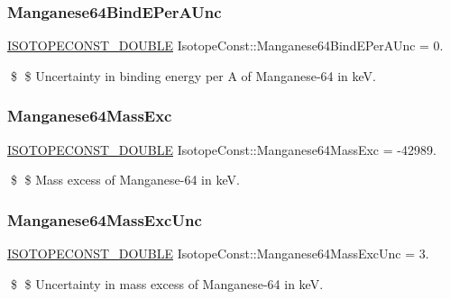 \subsubsection{\texorpdfstring{Manganese64\+Bind\+E\+Per\+A\+Unc}{Manganese64BindEPerAUnc}}
{\footnotesize\ttfamily \mbox{\hyperlink{group___isotope_const-_macros_ga8f45a7272ce02c0b4c65c44636ed719a}{I\+S\+O\+T\+O\+P\+E\+C\+O\+N\+S\+T\+\_\+\+D\+O\+U\+B\+LE}} Isotope\+Const\+::\+Manganese64\+Bind\+E\+Per\+A\+Unc = 0.}

\$ \$ Uncertainty in binding energy per A of Manganese-\/64 in keV. \mbox{\label{group___isotope_const-_manganese-_mn64_ga0b0d2cc874241dd2aa7dce0081704805}} 
\subsubsection{\texorpdfstring{Manganese64\+Mass\+Exc}{Manganese64MassExc}}
{\footnotesize\ttfamily \mbox{\hyperlink{group___isotope_const-_macros_ga8f45a7272ce02c0b4c65c44636ed719a}{I\+S\+O\+T\+O\+P\+E\+C\+O\+N\+S\+T\+\_\+\+D\+O\+U\+B\+LE}} Isotope\+Const\+::\+Manganese64\+Mass\+Exc = -\/42989.}

\$ \$ Mass excess of Manganese-\/64 in keV. \mbox{\label{group___isotope_const-_manganese-_mn64_gac96b3c13890dbd5dafa15fdbfd0d3296}} 
\subsubsection{\texorpdfstring{Manganese64\+Mass\+Exc\+Unc}{Manganese64MassExcUnc}}
{\footnotesize\ttfamily \mbox{\hyperlink{group___isotope_const-_macros_ga8f45a7272ce02c0b4c65c44636ed719a}{I\+S\+O\+T\+O\+P\+E\+C\+O\+N\+S\+T\+\_\+\+D\+O\+U\+B\+LE}} Isotope\+Const\+::\+Manganese64\+Mass\+Exc\+Unc = 3.}

\$ \$ Uncertainty in mass excess of Manganese-\/64 in keV. \mbox{\label{group___isotope_const-_manganese-_mn64_ga217d96ec23f0365a587da475e91367e4}} 
